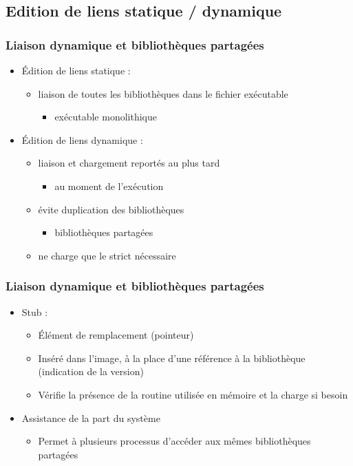 \subsection{Edition de liens statique / dynamique}

\begin{frame}
\frametitle{Liaison dynamique et bibliothèques partagées}
\begin{itemize}
\item Édition de liens statique :
\begin{itemize}
\item liaison de toutes les bibliothèques dans le fichier exécutable
\begin{itemize}
\item exécutable monolithique
\end{itemize}

\end{itemize}
\item <2->Édition de liens dynamique :
\begin{itemize}
\item liaison et chargement reportés au plus tard
\begin{itemize}
\item au moment de l'exécution
\end{itemize}
\item évite duplication des bibliothèques
\begin{itemize}
\item bibliothèques partagées
\end{itemize}
\item ne charge que le strict nécessaire
\end{itemize}
\end{itemize}
\end{frame}


\begin{frame}
\frametitle{Liaison dynamique et bibliothèques partagées}
\begin{itemize}
\item Stub :
\begin{itemize}
\item Élément de remplacement (pointeur)
\item Inséré dans l'image, à la place d'une référence à la bibliothèque (indication de la version)
\item Vérifie la présence de la routine utilisée en mémoire et la charge si besoin
\end{itemize}
\item Assistance de la part du système
\begin{itemize}
\item Permet à plusieurs processus d'accéder aux mêmes bibliothèques partagées
\end{itemize}
\end{itemize}
\end{frame}


